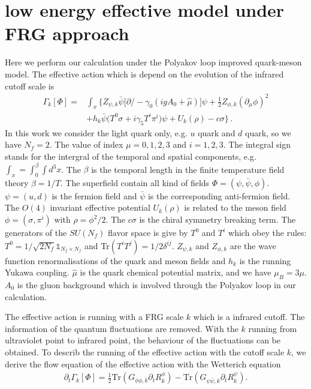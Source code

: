 \documentclass[%
reprint,
superscriptaddress,
showpacs,preprintnumbers,
 amsmath,amssymb,
 aps,
prd,
]{revtex4-1}
\begin{document}
\section{low energy effective model under FRG approach}
\label{sec:LEE}
Here we perform our calculation under the Polyakov loop improved quark-meson model. The effective action which is depend on the evolution of the infrared cutoff scale is
\begin{align}
  \Gamma_k[\Phi]=&\int_x \bigg\{Z_{\psi,k}\bar{\psi} \Big [\partial\!\!\!/ -\gamma_0(igA_0+\hat{\mu}) \Big ]\psi+\frac{1}{2}Z_{\phi,k}(\partial_\mu \phi)^2 \nonumber\\[2ex]
  &+h_k\bar{\psi}\big(T^0\sigma+i\gamma_5 T^i\pi^i\big)\psi+U_k(\rho)-c\sigma \bigg\}\,.
\label{eq:action}
\end{align}
In this work we consider the light quark only, e.g. $u$ quark and $d$ quark, so we have $N_f=2$. The value of index $\mu=0,1,2,3$ and $i=1,2,3$. The integral sign stands for the intergral of the temporal and spatial components, e.g. $\int_x=\int^\beta_0 \int d^3x$. The $\beta$ is the temporal length in the finite temperature field theory $\beta=1/T$. The superfield contain all kind of fields $\Phi=(\psi,\bar{\psi},\phi)$. $\psi=(u,d)$ is the fermion field and $\bar{\psi}$ is the corresponding anti-fermion field. The $O(4)$ invariant effective potential $U_k(\rho)$ is related to the meson field $\phi=(\sigma,\pi^i)$ with $\rho=\phi^2/2$. The $c\sigma$ is the chiral symmetry breaking term. The generators of the $SU(N_f)$ flavor space is give by $T^0$ and $T^i$ which obey the rules:$T^0=1/\sqrt{2N_f}\mathbb{1}_{N_f\times N_f}$ and Tr$(T^iT^j)=1/2\delta^{ij}$. $Z_{\psi,k}$ and $Z_{\phi,k}$ are the wave function renormalisations of the quark and meson fields and $h_k$ is the  running Yukawa coupling. $\hat{\mu}$ is the quark chemical potential matrix, and we have $\mu_B=3\mu$. $A_0$ is the gluon background which is involved through the Polyakov loop in our calculation.\par
The effective action is running with a FRG scale $k$ which is a infrared cutoff. The information of the quantum fluctuations are removed. With the $k$ running from ultraviolet point to infrared point, the behaviour of the fluctuations can be obtained. To describ the running of the effective action with the cutoff scale $k$, we derive the flow equation of the effective action with the Wetterich equation
\begin{align}
\partial_t\Gamma_k[\Phi]=\frac{1}{2}\mathrm{Tr}(G_{\phi\phi,k}\partial_t R^\phi_k)-\mathrm{Tr}(G_{\psi\bar{\psi},k}\partial_t R^\psi_k).
\end{align}
\end{document}
